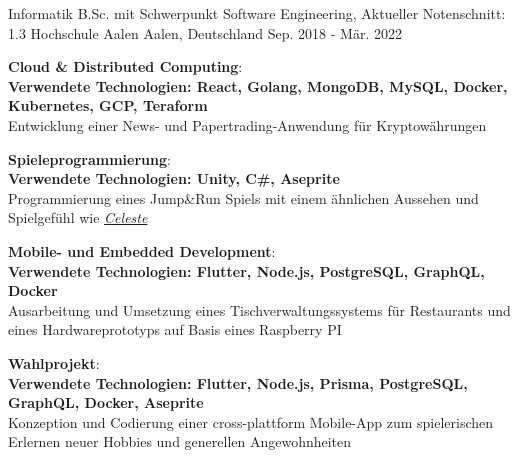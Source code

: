 

\begin{cventries}

  \cventry
    {Informatik B.Sc. mit Schwerpunkt Software Engineering, Aktueller Notenschnitt: 1.3} %
    {Hochschule Aalen} %
    {Aalen, Deutschland} %
    {Sep. 2018 - Mär. 2022} %
    {
      \begin{cvitems} %
        \item {\textbf{\faCloud{} Cloud \& Distributed Computing}: \\ 
         {\scriptsize\textbf{Verwendete Technologien: React, Golang, MongoDB, MySQL, Docker, Kubernetes, GCP, Teraform}} \\
         Entwicklung einer News- und Papertrading-Anwendung für Kryptowährungen}
        \item {\textbf{\faGamepad{} Spieleprogrammierung}: \\ 
         {\scriptsize\textbf{Verwendete Technologien: Unity, C\#, Aseprite}} \\
         Programmierung eines Jump\&Run Spiels mit einem ähnlichen Aussehen und Spielgefühl wie \href{https://store.steampowered.com/app/504230/Celeste/}{\textit{Celeste}}}
        \item {\textbf{\faMobile{} Mobile- und Embedded Development}: \\
        {\scriptsize\textbf{Verwendete Technologien: Flutter, Node.js, PostgreSQL, GraphQL, Docker}} \\
        Ausarbeitung und Umsetzung eines Tischverwaltungssystems für Restaurants und eines Hardwareprototyps auf Basis eines Raspberry PI}
        \item {\faHandSpockO{} \textbf{Wahlprojekt}: \\
        {\scriptsize\textbf{Verwendete Technologien: Flutter, Node.js, Prisma, PostgreSQL, GraphQL, Docker, Aseprite}} \\
        Konzeption und Codierung einer cross-plattform Mobile-App zum spielerischen Erlernen neuer Hobbies und generellen Angewohnheiten}
      \end{cvitems}
    }

\end{cventries}
